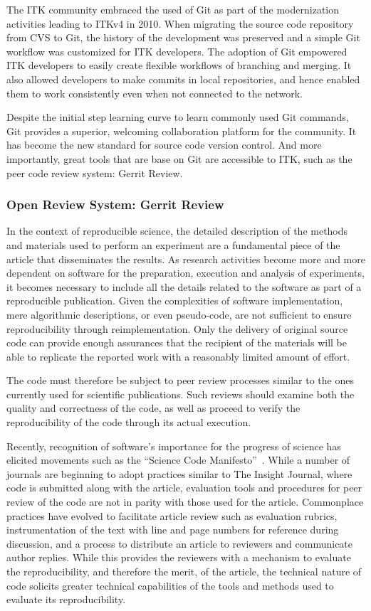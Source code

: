 \documentclass{frontiersENG} %
\begin{document}
The ITK community embraced the used of Git as part of the modernization activities
leading to ITKv4 in 2010.  When migrating the source code repository from CVS
to Git, the history of the development was preserved and a simple Git workflow
was customized for ITK developers.  The adoption of Git empowered ITK
developers to easily create flexible workflows of branching and merging. It
also allowed developers to make commits in local repositories, and hence
enabled them to work consistently even when not connected to the network.

Despite the initial step learning curve to learn commonly used Git commands,
Git provides a superior, welcoming collaboration platform for the community. It
has become the new standard for source code version control.  And more
importantly, great tools that are base on Git are accessible to ITK, such as
the peer code review system: Gerrit Review.


\subsubsection{Open Review System: Gerrit Review}

In the context of
reproducible science, the detailed description of the methods and materials
used to perform an experiment are a fundamental piece of the article that
disseminates the results. As research activities become more and more dependent
on software for the preparation, execution and analysis of experiments, it
becomes necessary to include all the details related to the software as part of
a reproducible publication. Given the complexities of software implementation,
mere algorithmic descriptions, or even pseudo-code, are not sufficient to ensure
reproducibility through reimplementation. Only the delivery of original source
code can provide enough assurances that the recipient of the materials will be
able to replicate the reported work with a reasonably limited amount of effort.

The code must therefore be subject to peer review processes similar to the ones
currently used for scientific publications. Such reviews should examine both
the quality and correctness of the code, as well as proceed to verify the
reproducibility of the code through its actual execution.

Recently, recognition of software's importance for the progress of science has
elicited movements such as the ``Science Code Manifesto''~\cite{Barnes2011}.
While a number of journals are beginning to adopt practices similar to The
Insight Journal, where code is submitted along with the article, evaluation
tools and procedures for peer review of the code are not in parity with those
used for the article. Commonplace practices have evolved to facilitate article
review such as evaluation rubrics, instrumentation of the text with line and
page numbers for reference during discussion, and a process to distribute an
article to reviewers and communicate author replies.  While this provides the
reviewers with a mechanism to evaluate the reproducibility, and therefore the
merit, of the article, the technical nature of code solicits greater technical
capabilities of the tools and methods used to evaluate its reproducibility.
\end{document}
